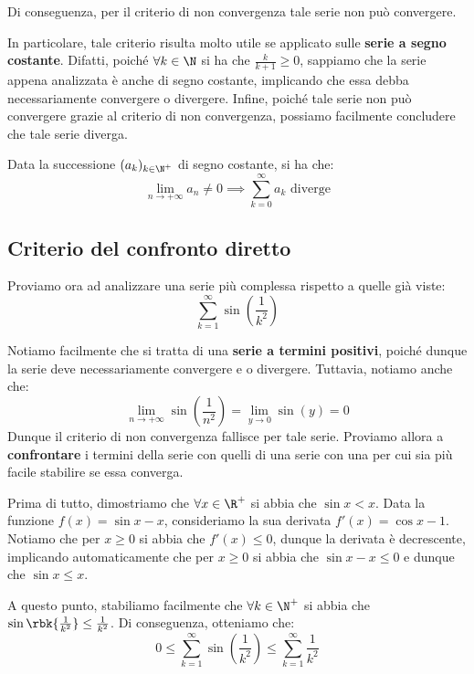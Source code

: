 \documentclass[a4paper, 12pt]{report}
\begin{document}
    Di conseguenza, per il criterio di non convergenza tale serie non può convergere.
    
    In particolare, tale criterio risulta molto utile se applicato sulle \textbf{serie a segno costante}. Difatti, poiché $\forall k \in \N$ si ha che $\frac{k}{k+1} \geq 0$, sappiamo che la serie appena analizzata è anche di segno costante, implicando che essa debba necessariamente convergere o divergere. Infine, poiché tale serie non può convergere grazie al criterio di non convergenza, possiamo facilmente concludere che tale serie diverga.

    \begin{framedcor}{}
        Data la successione $(a_k)_{k \in \N^+}$ di segno costante, si ha che:
        \[\lim_{n \to +\infty} a_n \neq 0 \implies \sum_{k = 0}^{\infty} a_k \text{ diverge}\]
    \end{framedcor}
    
    \quad

    \subsection{Criterio del confronto diretto}
    
    Proviamo ora ad analizzare una serie più complessa rispetto a quelle già viste:
    \[\sum_{k=1}^{\infty} \sin \left ( \frac{1}{k^2} \right )\]
    
    Notiamo facilmente che si tratta di una \textbf{serie a termini positivi}, poiché dunque la serie deve necessariamente convergere e o divergere. Tuttavia, notiamo anche che:
    \[\lim_{n \to +\infty} \sin \left ( \frac{1}{n^2}\right ) = \lim_{y \to 0} \sin \left ( y \right ) = 0\]
    Dunque il criterio di non convergenza fallisce per tale serie. Proviamo allora a \textbf{confrontare} i termini della serie con quelli di una serie con una per cui sia più facile stabilire se essa converga.

    Prima di tutto, dimostriamo che $\forall x \in \R^+$ si abbia che $\sin x < x$. Data la funzione $f(x) = \sin x - x$, consideriamo la sua derivata $f'(x) = \cos x - 1$. Notiamo che per $x \geq 0$ si abbia che $f'(x) \leq 0$, dunque la derivata è decrescente, implicando automaticamente che per $x \geq 0$ si abbia che $\sin x - x\leq 0$ e dunque che $\sin x \leq x$.

    A questo punto, stabiliamo facilmente che $\forall k \in \N^+$ si abbia che $\sin \rbk{\frac{1}{k^2}} \leq \frac{1}{k^2}$. Di conseguenza, otteniamo che:
    \[ 0 \leq \sum_{k=1}^{\infty} \sin \left ( \frac{1}{k^2} \right ) \leq \sum_{k=1}^{\infty} \frac{1}{k^2}\]
\end{document}
